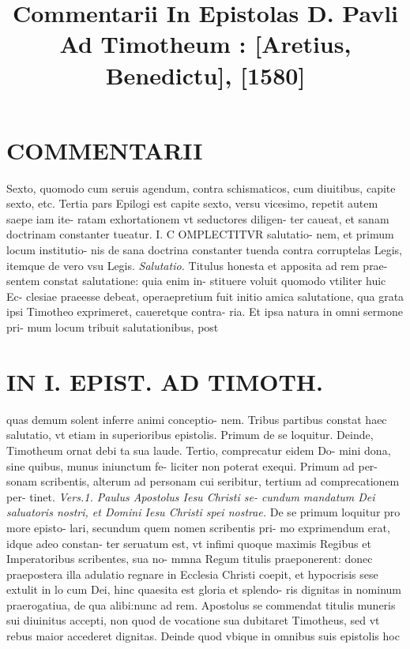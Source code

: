 \documentclass{article}
\begin{document}
\date{}
        \title{Commentarii In Epistolas D. Pavli Ad Timotheum : [Aretius, Benedictu], [1580]}
\maketitle

\begin{pages} 
\beginnumbering
        
\section*{COMMENTARII }
\marginpar{[ p.8 ]}\pstart Sexto, quomodo cum seruis agendum, contra schismaticos, cum diuitibus, capite sexto, etc.  \pend\pstart Tertia pars Epilogi est capite sexto, versu vicesimo, repetit autem saepe iam ite- ratam exhortationem vt seductores diligen- ter caueat, et sanam doctrinam constanter tueatur.  \pendCAPVT I. \pstart C OMPLECTITVR salutatio- nem, et primum locum institutio- nis de sana doctrina constanter tuenda contra corruptelas Legis, itemque de vero vsu Legis.  \pend
\textit{Salutatio. }\pstart Titulus honesta et apposita ad rem prae- sentem constat salutatione: quia enim in- stituere voluit quomodo vtiliter huic Ec- clesiae praeesse debeat, operaepretium fuit initio amica salutatione, qua grata ipsi Timotheo exprimeret, caueretque contra- ria. Et ipsa natura in omni sermone pri- mum locum tribuit salutationibus, post  \pend
\textbf{}
\section*{IN I. EPIST. AD TIMOTH. }
\marginpar{[ p.9 ]}\pstart quas demum solent inferre animi conceptio- nem.  \pend\pstart Tribus partibus constat haec salutatio, vt etiam in superioribus epistolis. Primum de se loquitur. Deinde, Timotheum ornat debi ta sua laude. Tertio, comprecatur eidem Do- mini dona, sine quibus, munus iniunctum fe- liciter non poterat exequi. Primum ad per- sonam scribentis, alterum ad personam cui seribitur, tertium ad comprecationem per- tinet.  \pend
\textit{Vers.1. Paulus Apostolus Iesu Christi se- cundum mandatum Dei saluatoris nostri, et Domini Iesu Christi spei nostrae. }\pstart De se primum loquitur pro more episto- lari, secundum quem nomen scribentis pri- mo exprimendum erat, idque adeo constan- ter seruatum est, vt infimi quoque maximis Regibus et Imperatoribus scribentes, sua no- mmna Regum titulis praeponerent: donec praepostera illa adulatio regnare in Ecclesia Christi coepit, et hypocrisis sese extulit in lo cum Dei, hinc quaesita est gloria et splendo- ris dignitas in nominum praerogatiua, de qua alibi:nunc ad rem. Apostolus se commendat titulis muneris sui diuinitus accepti, non quod de vocatione sua dubitaret Timotheus, sed vt rebus maior accederet dignitas. Deinde quod vbique in omnibus suis epistolis hoc  \pend

\end{pages}
\end{document}
